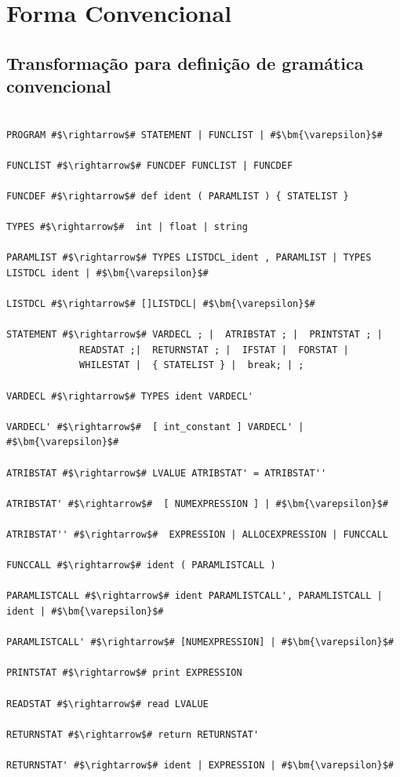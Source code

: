 \documentclass[
	12pt,				%
	openright,			%
	twoside,			%
	a4paper,			%
	english,			%
	french,				%
	spanish,			%
	brazil				%
	]{abntex2}
\begin{document}
\section{Forma Convencional}
\subsection{Transformação para definição de gramática convencional}
\begin{lstlisting}[escapechar=\#]

PROGRAM #$\rightarrow$# STATEMENT | FUNCLIST | #$\bm{\varepsilon}$# 

FUNCLIST #$\rightarrow$# FUNCDEF FUNCLIST | FUNCDEF  

FUNCDEF #$\rightarrow$# def ident ( PARAMLIST ) { STATELIST }  

TYPES #$\rightarrow$#  int | float | string 

PARAMLIST #$\rightarrow$# TYPES LISTDCL_ident , PARAMLIST | TYPES LISTDCL ident | #$\bm{\varepsilon}$#  

LISTDCL #$\rightarrow$# []LISTDCL| #$\bm{\varepsilon}$# 

STATEMENT #$\rightarrow$# VARDECL ; |  ATRIBSTAT ; |  PRINTSTAT ; |
             READSTAT ;|  RETURNSTAT ; |  IFSTAT |  FORSTAT |  
             WHILESTAT |  { STATELIST } |  break; | ; 

VARDECL #$\rightarrow$# TYPES ident VARDECL' 

VARDECL' #$\rightarrow$#  [ int_constant ] VARDECL' | #$\bm{\varepsilon}$#  

ATRIBSTAT #$\rightarrow$# LVALUE ATRIBSTAT' = ATRIBSTAT'' 

ATRIBSTAT' #$\rightarrow$#  [ NUMEXPRESSION ] | #$\bm{\varepsilon}$#  

ATRIBSTAT'' #$\rightarrow$#  EXPRESSION | ALLOCEXPRESSION | FUNCCALL 

FUNCCALL #$\rightarrow$# ident ( PARAMLISTCALL )  

PARAMLISTCALL #$\rightarrow$# ident PARAMLISTCALL', PARAMLISTCALL | ident | #$\bm{\varepsilon}$#  

PARAMLISTCALL' #$\rightarrow$# [NUMEXPRESSION] | #$\bm{\varepsilon}$# 

PRINTSTAT #$\rightarrow$# print EXPRESSION  

READSTAT #$\rightarrow$# read LVALUE  

RETURNSTAT #$\rightarrow$# return RETURNSTAT' 

RETURNSTAT' #$\rightarrow$# ident | EXPRESSION | #$\bm{\varepsilon}$#  


\end{lstlisting}
\end{document}
